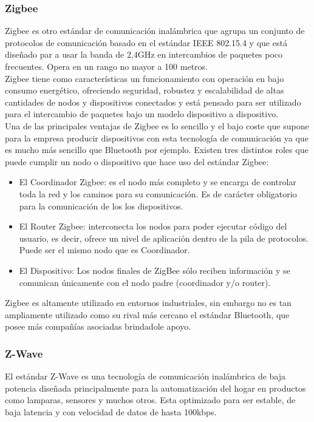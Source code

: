 \subsubsection{Zigbee}
Zigbee es otro estándar de comunicación inalámbrica que agrupa un conjunto de protocolos de comunicación basado en el estándar IEEE 802.15.4\cite{ieeezigbee} y que está diseñado par a usar la banda de 2,4GHz en intercambios de paquetes poco frecuentes. Opera en un rango no mayor a 100 metros.\\

Zigbee tiene como características un funcionamiento con operación en bajo consumo energético, ofreciendo seguridad, robustez y escalabilidad de altas cantidades de nodos y dispositivos conectados y está  pensado para ser utilizado para el intercambio de paquetes bajo un modelo dispositivo a dispositivo.\cite{iotstandars}\\

Una de las principales ventajas de Zigbee es lo sencillo y el bajo coste que supone para la empresa producir dispositivos con esta tecnología de comunicación ya que es mucho más sencillo que Bluetooth por ejemplo.\cite{androidzigbee} Existen tres distintos roles que puede cumplir un nodo o dispositivo que hace uso del estándar Zigbee:
\begin{itemize}
\item El Coordinador Zigbee: es el nodo más completo y se encarga de controlar toda la red y los caminos para su comunicación.\cite{androidzigbee} Es de carácter obligatorio para la comunicación de los los dispositivos.
\item El Router Zigbee: interconecta los nodos para poder ejecutar código del usuario, es decir, ofrece un nivel de aplicación dentro de la pila de protocolos.\cite{androidzigbee} Puede ser el mismo nodo que es Coordinador.
\item El Dispositivo: Los nodos finales de ZigBee sólo reciben información y se comunican únicamente con el nodo padre (coordinador y/o router).\cite{androidzigbee}
\end{itemize}

Zigbee es altamente utilizado en entornos industriales, sin embargo no es tan ampliamente utilizado como su rival más cercano el estándar Bluetooth, que posee más compañías asociadas brindadole apoyo. 

\subsubsection{Z-Wave}
El estándar Z-Wave es una tecnología de comunicación inalámbrica de baja potencia diseñada principalmente para la automatización del hogar en productos como lamparas, sensores y muchos otros. Esta optimizado para ser estable, de baja latencia y con velocidad de datos de hasta 100kbps.\cite{iotstandars}\\

